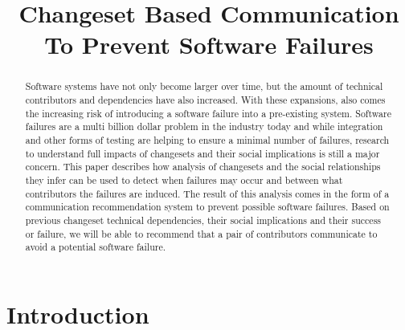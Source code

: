 \documentclass[conference]{IEEEtran}
\begin{document}
\title{Changeset Based Communication To Prevent Software Failures}

\author{
\and
{}
\and
{}
}

\maketitle


\begin{abstract}
Software systems have not only become larger over time, but the amount of
technical contributors and dependencies have also increased. With these expansions, also comes
the increasing risk of introducing a software failure into a pre-existing system.
Software failures are a multi billion dollar problem in the industry today and while integration and
other forms of testing are helping to ensure a minimal number of failures, research to understand
full impacts of changesets and their social implications is still a major concern. This paper describes
how analysis of changesets and the social relationships they infer can be used to detect when failures 
may occur and between what contributors the failures are induced. The result of this
analysis comes in the form of a communication recommendation system to prevent possible software 
failures. Based on previous changeset technical dependencies, their social implications and their 
success or failure,  we will be able to recommend that a pair of contributors communicate
to avoid a potential software failure.
\end{abstract}


\section{Introduction}
\end{document}
